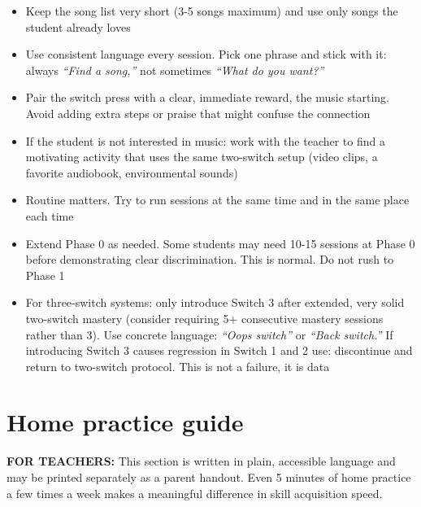 \documentclass[justified,openright]{tufte-book}
\renewcommand{\chaptermark}[1]{\markboth{#1}{}}
\begin{document}
\begin{itemize}

\item
  Keep the song list very short (3-5 songs maximum) and use only songs
  the student already loves
\item
  Use consistent language every session. Pick one phrase and stick with
  it: always \emph{``Find a song,''} not sometimes \emph{``What do you
  want?''}
\item
  Pair the switch press with a clear, immediate reward, the music
  starting. Avoid adding extra steps or praise that might confuse the
  connection
\item
  If the student is not interested in music: work with the teacher to
  find a motivating activity that uses the same two-switch setup (video
  clips, a favorite audiobook, environmental sounds)
\item
  Routine matters. Try to run sessions at the same time and in the same
  place each time
\item
  Extend Phase 0 as needed. Some students may need 10-15 sessions at
  Phase 0 before demonstrating clear discrimination. This is normal. Do
  not rush to Phase 1
\item
  For three-switch systems: only introduce Switch 3 after extended, very
  solid two-switch mastery (consider requiring 5+ consecutive mastery
  sessions rather than 3). Use concrete language: \emph{``Oops switch''}
  or \emph{``Back switch.''} If introducing Switch 3 causes regression
  in Switch 1 and 2 use: discontinue and return to two-switch protocol.
  This is not a failure, it is data
\end{itemize}

\chapter{Home practice guide}\label{section-10-family-and-caregiver-home-practice-guide}
\chaptermark{Home practice guide}



\textbf{FOR TEACHERS:} This section is written in plain, accessible
language and may be printed separately as a parent handout. Even 5
minutes of home practice a few times a week makes a meaningful
difference in skill acquisition speed.
\end{document}
